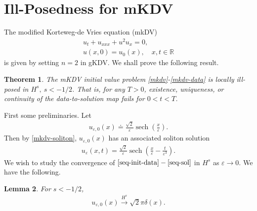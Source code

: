 \documentclass[12pt,reqno]{amsart}
\numberwithin{equation}{section}  %
\newcommand{\rr}{\mathbb{R}}
\newcommand{\ee}{\varepsilon}
\DeclareMathOperator{\sech}{sech}
\newtheorem{theorem}{Theorem}[section]
\newtheorem{lemma}[theorem]{Lemma}
\begin{document}
       \section{Ill-Posedness for mKDV} 
       \label{sec:ill-pos-mkdv}
       The modified Korteweg-de Vries equation (mkDV)
       \begin{gather}
          u_{t} + u_{xxx} + u^{2}u_{x} = 0, 
          \label{mkdv}
          \\
          u(x,0) = u_{0}(x), \quad x, t \in \rr
          \label{mkdv-data}
        \end{gather}
        is given by setting $n =2$ in gKDV. We shall prove the following result.
        \begin{theorem}
          The mKDV initial value problem \eqref{mkdv}-\eqref{mkdv-data} is
          locally ill-posed in $H^{s}, \ s<-1/2$. That is, for any $T > 0$, 
          existence, uniqueness, or continuity of the data-to-solution map fails
          for $0 < t < T$. 
        \label{thm:mkdv-ill-pos}
        \end{theorem}
        First some preliminaries. Let 
        \begin{equation}
          \label{seq-init-data}
        \begin{split}
          u_{\ee, 0}(x) \doteq \frac{\sqrt{2}}{\ee} \sech\left( \frac{x}{\ee}
          \right).
        \end{split}
        \end{equation}
        Then by \eqref{mkdv-soliton}, $u_{\ee, 0}(x)$ has an associated soliton
        solution
        \begin{equation}
          \label{seq-sol}
        \begin{split}
          u_{\ee}(x,t) = \frac{\sqrt{2}}{\ee} \sech\left( \frac{x}{ \ee} -
          \frac{t}{ \ee^{3}} \right).
        \end{split}
        \end{equation}
        We wish to study the convergence of
        $\eqref{seq-init-data}-\eqref{seq-sol}$ in $H^{s}$ as $\ee \to 0$. We
        have the following. 
        \begin{lemma}
          For $s< -1/2$,
          \begin{equation*}
          \begin{split}
            u_{\ee, 0}(x) \xrightarrow{H^{s}} \sqrt{2} \pi \delta(x).
          \end{split}
          \end{equation*}
          \label{lem:seq-data-strong-conv}
        \end{lemma}
\end{document}
